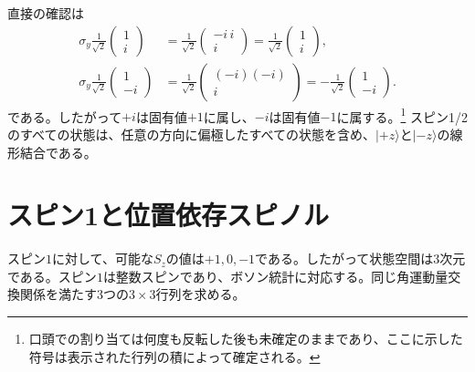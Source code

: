 直接の確認は
\begin{align}
\sigma_y\frac{1}{\sqrt2}
\begin{pmatrix}
1\\
i
\end{pmatrix}
&=
\frac{1}{\sqrt2}
\begin{pmatrix}
-i\,i\\
i
\end{pmatrix}
=
\frac{1}{\sqrt2}
\begin{pmatrix}
1\\
i
\end{pmatrix},\\
\sigma_y\frac{1}{\sqrt2}
\begin{pmatrix}
1\\
-i
\end{pmatrix}
&=
\frac{1}{\sqrt2}
\begin{pmatrix}
(-i)(-i)\\
i
\end{pmatrix}
=
-\frac{1}{\sqrt2}
\begin{pmatrix}
1\\
-i
\end{pmatrix}.
\end{align}
である。したがって\(+i\)は固有値\(+1\)に属し、\(-i\)は固有値\(-1\)に属する。\footnote{口頭での割り当ては何度も反転した後も未確定のままであり、ここに示した符号は表示された行列の積によって確定される。} スピン1/2のすべての状態は、任意の方向に偏極したすべての状態を含め、\(|+z\rangle\)と\(|-z\rangle\)の線形結合である。

\section{スピン1と位置依存スピノル}

スピン\(1\)に対して、可能な\(S_z\)の値は\(+1,0,-1\)である。したがって状態空間は3次元である。スピン\(1\)は整数スピンであり、ボソン統計に対応する。同じ角運動量交換関係を満たす3つの\(3\times3\)行列を求める。

